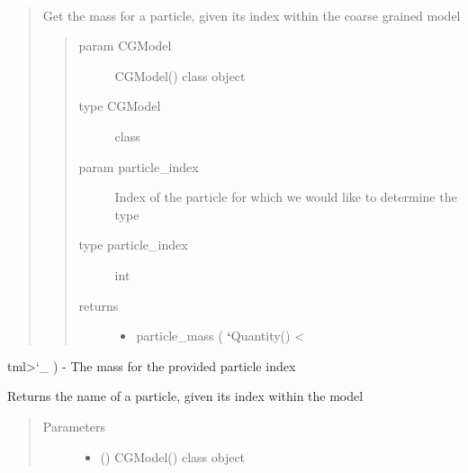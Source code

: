 \documentclass[letterpaper,12pt,english,openany,oneside]{sphinxmanual}
\begin{document}
\begin{fulllineitems}
\begin{fulllineitems}
\end{fulllineitems}


\begin{fulllineitems}
\label{\detokenize{cg_model:cg_model.cgmodel.CGModel.get_particle_mass}}~\begin{quote}

Get the mass for a particle, given its index within the coarse grained model
\begin{quote}\begin{description}
\item[{param CGModel}] \leavevmode
CGModel() class object

\item[{type CGModel}] \leavevmode
class

\item[{param particle\_index}] \leavevmode
Index of the particle for which we would like to determine the type

\item[{type particle\_index}] \leavevmode
int

\item[{returns}] \leavevmode\begin{itemize}
\item {} 
particle\_mass ( {\color{red}\bfseries{}{}`}Quantity() \textless{}

\end{itemize}

\end{description}\end{quote}
\end{quote}

tml\textgreater{}{}`\_ ) - The mass for the provided particle index

\end{fulllineitems}


\begin{fulllineitems}
\label{\detokenize{cg_model:cg_model.cgmodel.CGModel.get_particle_name}}
Returns the name of a particle, given its index within the model
\begin{quote}\begin{description}
\item[{Parameters}] \leavevmode\begin{itemize}
\item {} 
 () \textendash{} CGModel() class object


\end{itemize}
\end{description}
\end{quote}
\end{fulllineitems}
\end{fulllineitems}
\end{document}
